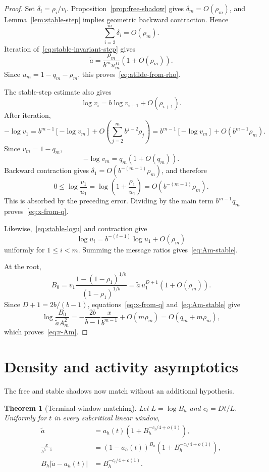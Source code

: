 \documentclass[11pt]{amsart}
\newtheorem{theorem}{Theorem}[section]
\theoremstyle{definition}
\begin{document}
\begin{proof}
Set $\delta_i=\rho_i/v_i$.  Proposition~\ref{prop:free-shadow} gives $\delta_m=O(\rho_m)$, and Lemma~\ref{lem:stable-step} implies geometric backward contraction.  Hence
\[
 \sum_{i=2}^m\delta_i=O(\rho_m).
\]
Iteration of~\eqref{eq:stable-invariant-step} gives
\[
 \widetilde a
 =\frac{\rho_m}{b^m u_m^D}\left(1+O(\rho_m)\right).
\]
Since $u_m=1-q_m-\rho_m$, this proves~\eqref{eq:atilde-from-rho}.

The stable-step estimate also gives
\[
 \log v_i=b\log v_{i+1}+O(\rho_{i+1}).
\]
After iteration,
\[
 -\log v_1
 =b^{m-1}[-\log v_m]
 +O\left(\sum_{j=2}^m b^{j-2}\rho_j\right)
 =b^{m-1}[-\log v_m]+O(b^{m-1}\rho_m).
\]
Since $v_m=1-q_m$,
\[
 -\log v_m=q_m(1+O(q_m)).
\]
Backward contraction gives $\delta_1=O(b^{-(m-1)}\rho_m)$, and therefore
\[
 0\le\log\frac{v_1}{u_1}
 =\log\left(1+\frac{\rho_1}{u_1}\right)
 =O(b^{-(m-1)}\rho_m).
\]
This is absorbed by the preceding error.  Dividing by the main term
$b^{m-1}q_m$ proves~\eqref{eq:x-from-q}.

Likewise,~\eqref{eq:stable-logu} and contraction give
\[
 \log u_i=b^{-(i-1)}\log u_1+O(\rho_m)
\]
uniformly for $1\le i<m$.  Summing the message ratios gives~\eqref{eq:Am-stable}.

At the root,
\[
 B_0=v_1\frac{1-(1-\rho_1)^{1/b}}{(1-\rho_1)^{1/b}}
 =\widetilde a\,u_1^{D+1}\left(1+O(\rho_m)\right).
\]
Since $D+1=2b/(b-1)$, equations~\eqref{eq:x-from-q} and~\eqref{eq:Am-stable} give
\[
 \log\frac{B_0}{\widetilde a A_m^2}
 =-\frac{2b}{b-1}\frac{x}{b^{m-1}}+O(m\rho_m)
 =O(q_m+m\rho_m),
\]
which proves~\eqref{eq:r-Am}.
\end{proof}


\section{Density and activity asymptotics}
The free and stable shadows now match without an additional hypothesis.

\begin{theorem}[Terminal-window matching]\label{thm:matching}
Let $L=\log B_h$ and $c_t=Dt/L$.  Uniformly for $t$ in every subcritical linear window,
\begin{align}
 \widetilde a&=a_h(t)\left(1+B_h^{-c_t/4+o(1)}\right),\label{eq:atilde-a}\\
 \frac{x}{b^{h-1}}
 &=(1-a_h(t))^{B_h}
 \left(1+B_h^{-c_t/4+o(1)}\right),\label{eq:x-coupon}\\
 B_h\lvert\widetilde a-a_h(t)\rvert
 &=B_h^{-c_t/4+o(1)}.\label{eq:atilde-a-absolute}
\end{align}
\end{theorem}
\end{document}
